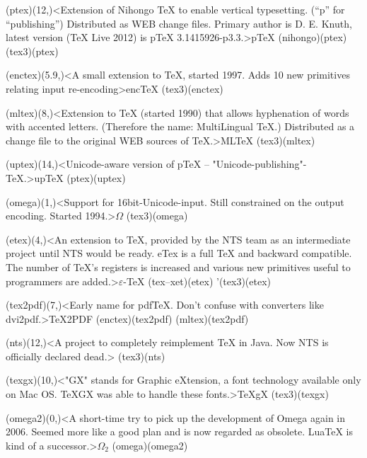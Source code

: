 {	\tonode(ptex)(12,\layer)<Extension of Nihongo TeX to enable vertical typesetting. (“p” for “publishing”)  Distributed as WEB change files. Primary author is D. E. Knuth, latest version (TeX Live 2012) is pTeX 3.1415926-p3.3.>{p\TeX}
		\todraw(nihongo)(ptex)
		\todraw(tex3)(ptex)

	\steplayer[-1.5]
	
	\tonode(enctex)(5.9,\layer)<A small extension to TeX, started 1997. Adds 10 new primitives relating input re-encoding>{enc\TeX}
	\todraw(tex3)(enctex)
	
	\tonode(mltex)(8,\layer)<Extension to TeX (started 1990) that allows hyphenation of words with accented letters. (Therefore the name: MultiLingual TeX.) Distributed as a change file to the original WEB sources of TeX.>{ML\TeX}
	\todraw(tex3)(mltex)
	
	\tonode[\experimental](uptex)(14,\layer)<Unicode-aware version of pTeX – "Unicode-publishing"-TeX.>{up\TeX}
		\todraw(ptex)(uptex)
	\steplayer[-2]

	\tonode[\experimental](omega)(1,\layer)<Support for 16bit-Unicode-input. Still constrained on the output encoding. Started 1994.>{$\Omega$}
		\todraw(tex3)(omega)
	
	\tonode[\vip](etex)(4,\layer)<An extension to TeX, provided by the NTS team as an intermediate project until NTS would be ready. eTex is a full TeX and backward compatible. The number of TeX's registers is increased and various new primitives useful to programmers are added.>{$\varepsilon$-\TeX}
		\todraw(tex--xet)(etex)
		\todraw'(tex3)(etex)

	\tonode(tex2pdf)(7,\layer)<Early name for pdfTeX. Don't confuse with converters like dvi2pdf.>{\TeX2PDF}
		\todraw(enctex)(tex2pdf)
		\todraw(mltex)(tex2pdf)
	
	\tonode(nts)(12,\layer)<A project to completely reimplement TeX in Java. Now NTS is officially declared dead.>{\NTS}
		\todraw(tex3)(nts)

	\steplayer[-1]

	\tonode(texgx)(10,\layer)<"GX" stands for Graphic eXtension, a font technology available only on Mac OS. TeXGX was able to handle these fonts.>{\TeX{}gX}
		\todraw(tex3)(texgx)

	\steplayer[-1]

	\tonode[\experimental](omega2)(0,\layer)<A short-time try to pick up the development of Omega again in 2006. Seemed more like a good plan and is now regarded as obsolete. LuaTeX is kind of a successor.>{$\Omega_2$}
		\todraw(omega)(omega2)
	
}
